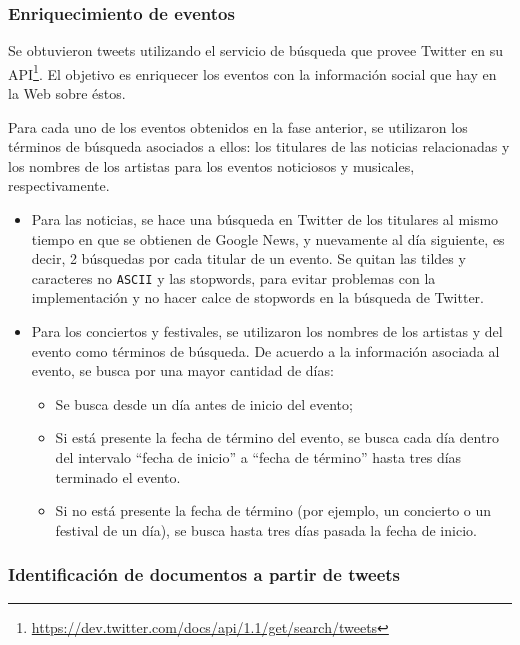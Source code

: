 \documentclass[upright, contnum]{umemoria}
\begin{document}
\subsubsection{Enriquecimiento de eventos}

Se obtuvieron tweets utilizando el servicio de búsqueda que provee
Twitter en su
API\footnote{\href{https://dev.twitter.com/docs/api/1.1/get/search/tweets}{https://dev.twitter.com/docs/api/1.1/get/search/tweets} }. El
objetivo es enriquecer los eventos con la información social que hay
en la Web sobre éstos. 

Para cada uno de los eventos obtenidos en la fase anterior, se
utilizaron los términos de búsqueda asociados a ellos: los titulares
de las noticias relacionadas y los nombres de los artistas para los
eventos noticiosos y musicales, respectivamente.

\begin{itemize}
\item Para las noticias, se hace una búsqueda en Twitter de los titulares
  al mismo tiempo en que se obtienen de Google News, y nuevamente al
  día siguiente, es decir, 2 búsquedas por cada titular de un evento.
  Se quitan las tildes y caracteres no \texttt{ASCII} y las stopwords, para
  evitar problemas con la implementación y no hacer calce de stopwords
  en la búsqueda de Twitter.
\item Para los conciertos y festivales, se utilizaron los nombres de los
  artistas y del evento como términos de búsqueda. De acuerdo a la
  información asociada al evento, se busca por una mayor cantidad de
  días:

\begin{itemize}
\item Se busca desde un día antes de inicio del evento;
\item Si está presente la fecha de término del evento, se busca cada día
    dentro del intervalo ``fecha de inicio'' a ``fecha de término'' hasta
    tres días terminado el evento.
\item Si no está presente la fecha de término (por ejemplo, un concierto
    o un festival de un día), se busca hasta tres días pasada la fecha
    de inicio.
\end{itemize}

\end{itemize}
\subsubsection{Identificación de documentos a partir de tweets}
\end{document}
